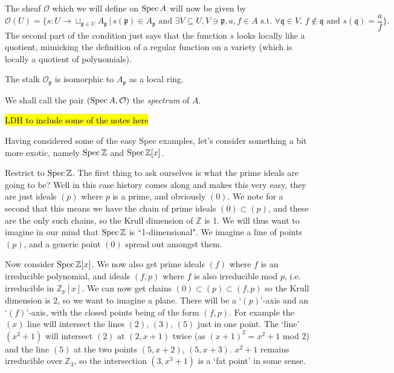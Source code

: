 \documentclass[000-main.tex]{subfiles}
\begin{document}
The sheaf $\mathcal{O}$ which we will define on $\operatorname{Spec} A$ will now be given by 
\[
\mathcal{O}(U) = \lbrace s : U \to \sqcup_{\mathfrak{p} \in U} A_{\mathfrak{p}} \, | \, s(\mathfrak{p}) \in A_{\mathfrak{p}} \text{ and } \exists V \subseteq U, V \ni \mathfrak{p}, a, f \in A \text{ s.t. } \forall \mathfrak{q} \in V, \, f \notin \mathfrak{q} \text{ and } s(\mathfrak{q}) = \frac{a}{f} \rbrace.  
\]
The second part of the condition just says that the function $s$ looks locally like a quotient, mimicking the definition of a regular function on a variety (which is locally a quotient of polynomials). 

\begin{lemma}
	The stalk $\mathcal{O}_{\mathfrak{p}}$ is isomorphic to $A_{\mathfrak{p}}$ as a local ring. 
\end{lemma}

We shall call the pair $(\operatorname{Spec} A, \mathcal{O})$ the \emph{spectrum} of $A$. 

\hl{LDH to include some of the notes here}

\begin{example}
	Having considered some of the easy Spec examples, let's consider something a bit more exotic, namely $\operatorname{Spec} \mathbb{Z}$ and $\operatorname{Spec} \mathbb{Z}[x]$. 
	
	
	Restrict to $\operatorname{Spec} \mathbb{Z}$. The first thing to ask ourselves is what the prime ideals are going to be? Well in this case history comes along and makes this very easy, they are just ideals $(p)$ where $p$ is a prime, and obviously $(0)$. We note for a second that this means we have the chain of prime ideals $(0) \subset (p)$, and these are the only such chains, so the Krull dimension of $\mathbb{Z}$ is 1. We will thus want to imagine in our mind that $\operatorname{Spec} \mathbb{Z}$ is ``1-dimensional". We imagine a line of points $(p)$, and a generic point $(0)$ spread out amongst them. 
	
	Now consider $\operatorname{Spec} \mathbb{Z}[x]$. We now also get prime ideals $(f)$ where $f$ is an irreducible polynomial, and ideals $(f, p)$ where $f$ is also irreducible mod $p$, i.e. irreducible in $\mathbb{Z}_p[x]$. We can now get chains $(0) \subset (p) \subset (f, p)$ so the Krull dimension is 2, so we want to imagine a plane. There will be a `$(p)$'-axis and an `$(f)$'-axis, with the closed points being of the form $(f, p)$. For example the $(x)$ line will intersect the lines $(2)$, $(3)$, $(5)$ just in one  point. The `line' $(x^2+1)$ will intersect $(2)$ at $(2, x+1)$ twice (as $(x+1)^2 = x^2 + 1$ mod 2) and the line $(5)$ at the two points $(5, x+2)$, $(5, x+3)$. $x^2+1$ remains irreducible over $\mathbb{Z}_3$, so the intersection $(3, x^3+1)$ is a `fat point' in some sense. 
\end{example}
\end{document}
